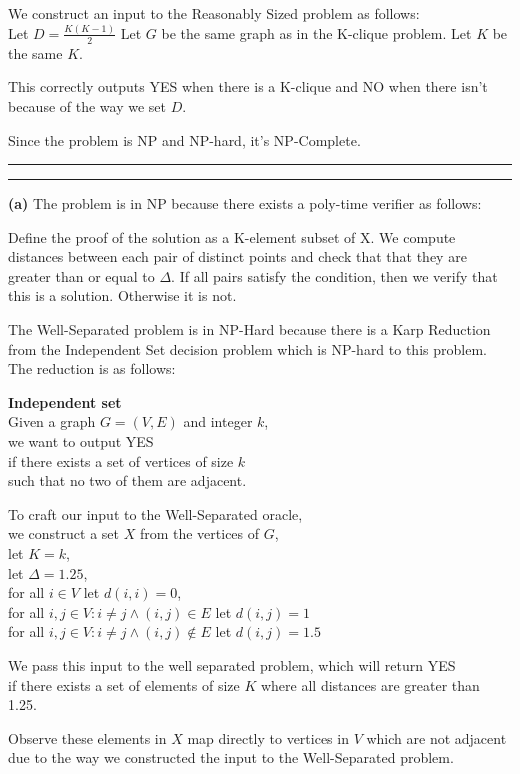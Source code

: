 \documentclass[11pt]{article}
\newcommand{\question}[2] {\vspace{.25in} \hrule\vspace{0.5em}
\noindent{\bf #1: #2} \vspace{0.5em}
\hrule \vspace{.10in}}
\renewcommand{\part}[1] {\vspace{.10in} {\bf (#1)}}
\begin{document}
We construct an input to the Reasonably Sized problem as follows:\\
Let $D = \frac{K(K-1)}{2}$
Let $G$ be the same graph as in the K-clique problem.
Let $K$ be the same $K$.

This correctly outputs YES when there is a K-clique and NO when there isn't because of the way we set $D$.

Since the problem is NP and NP-hard, it's NP-Complete.

\question{3}{A Well-Separated Problem}
\part{a}
The problem is in NP because there exists a poly-time verifier as follows:

Define the proof of the solution as a K-element subset of X. We compute distances
between each pair of distinct points and check that that they are greater than or equal to $\Delta$.
If all pairs satisfy the condition, then we verify that this is a solution. Otherwise it is not.

The Well-Separated problem is in NP-Hard because there is a Karp Reduction from the Independent Set decision problem which is NP-hard to this problem.
The reduction is as follows:

\textbf{Independent set}\\
Given a graph $G = (V,E)$ and integer $k$,\\
we want to output YES\\
if there exists a set of vertices of size $k$\\
such that no two of them are adjacent.

To craft our input to the Well-Separated oracle,\\
we construct a set $X$ from the vertices of $G$,\\
let $K = k$,\\
let $\Delta = 1.25$,\\
for all $i \in V$ let $d(i,i) = 0$,\\
for all $i,j \in V : i \neq j \wedge (i,j) \in E$ let $d(i,j) = 1$\\
for all $i,j \in V : i \neq j \wedge (i,j) \notin E$ let $d(i,j) = 1.5$

We pass this input to the well separated problem, which will return YES\\
if there exists a set of elements of size $K$ where all distances are greater than 1.25.

Observe these elements in $X$ map directly to vertices in $V$ which are not adjacent\\
due to the way we constructed the input to the Well-Separated problem.
\end{document}
